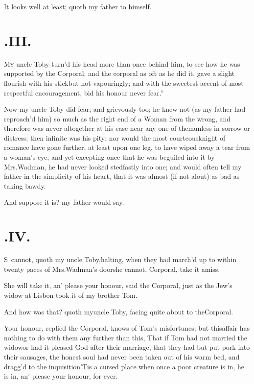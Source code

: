 \documentclass{article}
\begin{document}
\tsh It looks well at least; quoth my father to
himself.

\newpage
\section{.\enspace III.}

\lettrine{M}{y} uncle Toby turn’d his
head more than once behind him, to see how he was supported by the
Corporal; and the corporal as oft as he did it, gave a slight
flourish with his stick\tsk but not vapouringly; and with the
sweetest accent of most respectful encouragement, bid his honour
\lqq never fear.”

Now my uncle Toby did fear; and grievously too; he knew
not (as my father had reproach’d him) so much as the right
end of a Woman from the wrong, and therefore was never altogether
at his ease near any one of them\tsh unless in
sorrow or distress; then infinite was his pity; nor would the most
courteous\pb knight of romance have gone further, at least upon one
leg, to have wiped away a tear from a woman’s eye; and yet
excepting once that he was beguiled into it by Mrs.\@ Wadman,
he had never looked stedfastly into one; and would often tell my
father in the simplicity of his heart, that it was almost (if not
alout) as bad as taking bawdy.\tsh

\tsh And suppose it is? my father would say.

\newpage
\section{.\enspace IV.}

\lettrine{S}{\,} cannot, quoth my uncle
Toby,\break halting, when they had march’d up to within
twenty paces of Mrs.\@ Wadman’s door\tsk she cannot,
Corporal, take it amiss.\tsh

\tsh She will take it, an’ please your honour,
said the Corporal, just as the Jew’s widow at
Lisbon took it of my brother Tom.\tsh

\tsh And how was that? quoth my\break uncle Toby,
facing quite about to the\break Corporal.

Your honour, replied the Corporal, knows of Tom’s
misfortunes; but this\pb affair has nothing to do with them any
further than this, That if Tom had not married the
widow\tsk or had it pleased God after their marriage, that
they had but put pork into their sausages, the honest soul had
never been taken out of his warm bed, and dragg’d to the
inquisition\tsk ’Tis a cursed place\tsk\break
{}
\tsk when once a poor creature is in,
he is in, an’ please your honour, for ever.
\end{document}
